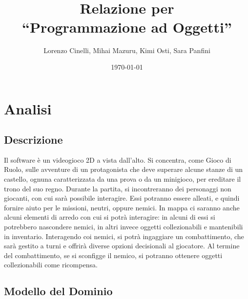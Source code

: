 \documentclass[a4paper,12pt]{report}
\title{Relazione per\\``Programmazione ad Oggetti''}
\author{Lorenzo Cinelli, Mihai Mazuru, Kimi Osti, Sara Panfini}
\date{\today}
\begin{document}
\maketitle

\begin{abstract}

\end{abstract}

\tableofcontents

\chapter{Analisi}


\section{Descrizione}

Il software è un videogioco 2D a vista dall'alto. Si concentra, come Gioco di Ruolo, sulle avventure di un protagonista
che deve superare alcune stanze di un castello, ognuna caratterizzata da una prova o da un minigioco, per ereditare
il trono del suo regno.
%
Durante la partita, si incontreranno dei personaggi non giocanti, con cui sarà possibile interagire. Essi potranno
essere alleati, e quindi fornire aiuto per le missioni, neutri, oppure nemici. 
%
In mappa ci saranno anche alcuni elementi di arredo con cui si potrà interagire: in alcuni di essi si potrebbero
nascondere nemici, in altri invece oggetti collezionabili e mantenibili in inventario.
%
Interagendo coi nemici, si potrà ingaggiare un combattimento, che sarà gestito a turni e offrirà diverse opzioni
decisionali al giocatore. Al termine del combattimento, se si sconfigge il nemico, si potranno ottenere oggetti
collezionabili come ricompensa. 

\section{Modello del Dominio}
\end{document}
